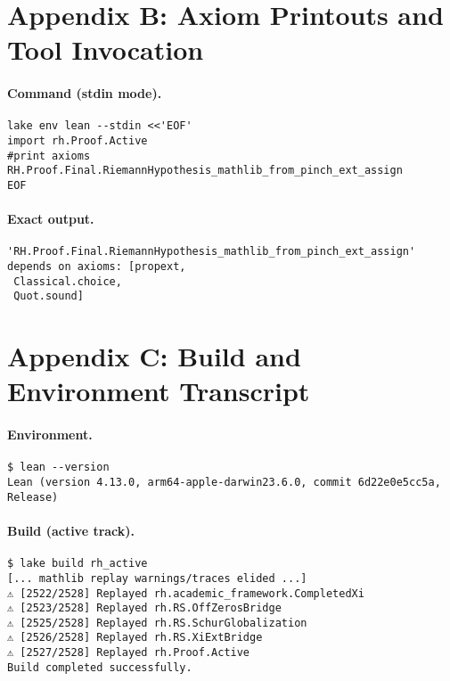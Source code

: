 \documentclass[11pt]{article}
\theoremstyle{plain}
\theoremstyle{definition}
\begin{document}
\section*{Appendix B: Axiom Printouts and Tool Invocation}

\paragraph{Command (stdin mode).}
{\small
\begin{verbatim}
lake env lean --stdin <<'EOF'
import rh.Proof.Active
#print axioms RH.Proof.Final.RiemannHypothesis_mathlib_from_pinch_ext_assign
EOF
\end{verbatim}
}

\paragraph{Exact output.}
{\small
\begin{verbatim}
'RH.Proof.Final.RiemannHypothesis_mathlib_from_pinch_ext_assign' depends on axioms: [propext,
 Classical.choice,
 Quot.sound]
\end{verbatim}
}


\section*{Appendix C: Build and Environment Transcript}

\paragraph{Environment.}
{\small
\begin{verbatim}
$ lean --version
Lean (version 4.13.0, arm64-apple-darwin23.6.0, commit 6d22e0e5cc5a, Release)
\end{verbatim}
}

\paragraph{Build (active track).}
{\small
\begin{verbatim}
$ lake build rh_active
[... mathlib replay warnings/traces elided ...]
⚠ [2522/2528] Replayed rh.academic_framework.CompletedXi
⚠ [2523/2528] Replayed rh.RS.OffZerosBridge
⚠ [2525/2528] Replayed rh.RS.SchurGlobalization
⚠ [2526/2528] Replayed rh.RS.XiExtBridge
⚠ [2527/2528] Replayed rh.Proof.Active
Build completed successfully.
\end{verbatim}
}
\end{document}
